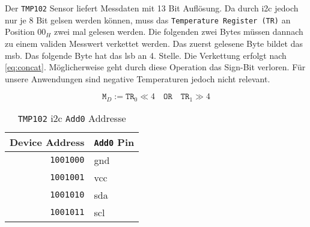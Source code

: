 Der \texttt{TMP102} Sensor liefert Messdaten mit 13 Bit Auflösung.
Da durch \gls{i2c} jedoch nur je 8 Bit gelsen werden können, muss das \texttt{Temperature Register (TR)} an Position $00_H$ zwei mal gelesen werden.
Die folgenden zwei Bytes müssen dannach zu einem validen Messwert verkettet werden.
Das zuerst gelesene Byte bildet das \gls{msb}.
Das folgende Byte hat das \gls{lsb} an 4. Stelle.
Die Verkettung erfolgt nach \autoref{eq:concat}.
Möglicherweise geht durch diese Operation das Sign-Bit verloren.
Für unsere Anwendungen sind negative Temperaturen jedoch nicht relevant.

\begin{equation}
    \texttt{M}_D := \texttt{TR}_0 \ll 4 \quad \texttt{OR} \quad \texttt{TR}_1 \gg 4
    \label{eq:concat}
\end{equation}

\begin{table}[h]
    \centering
    \begin{tabular}{|r|l|}
        \hline
        \textbf{Device Address} & \textbf{\texttt{Add0} Pin}\\
        \hline
        \hline
        \texttt{1001000} & \gls{gnd} \\
        \hline
        \texttt{1001001} & \gls{vcc} \\
        \hline
        \texttt{1001010} & \gls{sda} \\
        \hline
        \texttt{1001011} & \gls{scl} \\
        \hline
    \end{tabular}
    \caption{\texttt{TMP102} \gls{i2c} \texttt{Add0} Addresse}
    \label{tab:address}
\end{table}

